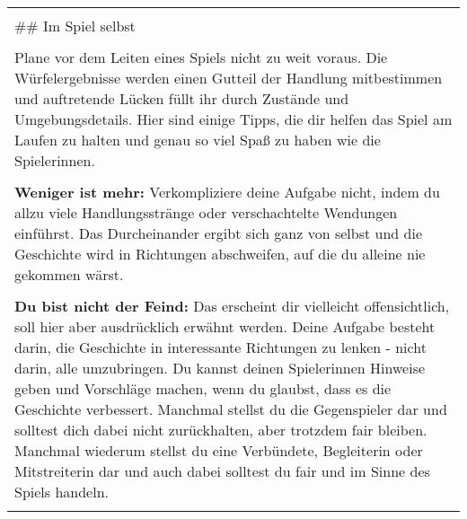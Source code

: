 \documentclass[]{article}
\begin{document}
\begin{longtable}[]{@{}l@{}}
\begin{minipage}[t]{0.05\columnwidth}
\strut\end{minipage}\tabularnewline
\begin{minipage}[t]{0.05\columnwidth}\raggedright\strut
\#\# Im Spiel selbst
\strut\end{minipage}\tabularnewline
\begin{minipage}[t]{0.05\columnwidth}\raggedright\strut
\strut\end{minipage}\tabularnewline
\begin{minipage}[t]{0.05\columnwidth}\raggedright\strut
Plane vor dem Leiten eines Spiels nicht zu weit voraus. Die
Würfelergebnisse werden einen Gutteil der Handlung mitbestimmen und
auftretende Lücken füllt ihr durch Zustände und Umgebungsdetails. Hier
sind einige Tipps, die dir helfen das Spiel am Laufen zu halten und
genau so viel Spaß zu haben wie die Spielerinnen.
\strut\end{minipage}\tabularnewline
\begin{minipage}[t]{0.05\columnwidth}\raggedright\strut
\strut\end{minipage}\tabularnewline
\begin{minipage}[t]{0.05\columnwidth}\raggedright\strut
\textbf{Weniger ist mehr:} Verkompliziere deine Aufgabe nicht, indem du
allzu viele Handlungsstränge oder verschachtelte Wendungen einführst.
Das Durcheinander ergibt sich ganz von selbst und die Geschichte wird in
Richtungen abschweifen, auf die du alleine nie gekommen wärst.
\strut\end{minipage}\tabularnewline
\begin{minipage}[t]{0.05\columnwidth}\raggedright\strut
\strut\end{minipage}\tabularnewline
\begin{minipage}[t]{0.05\columnwidth}\raggedright\strut
\textbf{Du bist nicht der Feind:} Das erscheint dir vielleicht
offensichtlich, soll hier aber ausdrücklich erwähnt werden. Deine
Aufgabe besteht darin, die Geschichte in interessante Richtungen zu
lenken - nicht darin, alle umzubringen. Du kannst deinen Spielerinnen
Hinweise geben und Vorschläge machen, wenn du glaubst, dass es die
Geschichte verbessert. Manchmal stellst du die Gegenspieler dar und
solltest dich dabei nicht zurückhalten, aber trotzdem fair bleiben.
Manchmal wiederum stellst du eine Verbündete, Begleiterin oder
Mitstreiterin dar und auch dabei solltest du fair und im Sinne des
Spiels handeln.
\strut\end{minipage}\tabularnewline
\begin{minipage}[t]{0.05\columnwidth}\raggedright\strut

\end{minipage}
\end{longtable}
\end{document}
